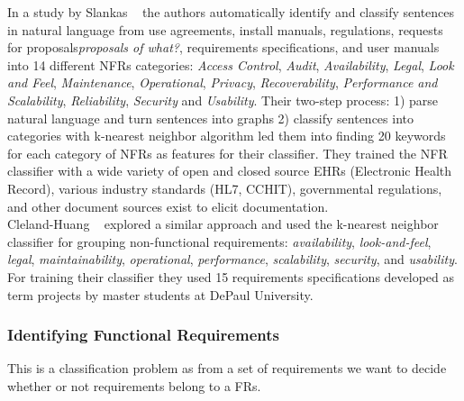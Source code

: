 In a study by Slankas \etal~\cite{Slankas:2013} the authors automatically
identify and classify sentences in natural language from use agreements, install
manuals, regulations, requests for proposals\emph{proposals of what?},
requirements specifications, and user manuals into 14 different NFRs categories:
\emph{Access Control}, \emph{Audit}, \emph{Availability}, \emph{Legal},
\emph{Look and Feel}, \emph{Maintenance}, \emph{Operational}, \emph{Privacy},
\emph{Recoverability}, \emph{Performance and Scalability}, \emph{Reliability},
\emph{Security} and \emph{Usability}.
Their two-step process: 1) parse natural language and turn sentences into graphs
2) classify sentences into categories with k-nearest neighbor algorithm led them
into finding 20 keywords for each category of NFRs as features for their
classifier. They trained the NFR classifier
with a wide variety of open and closed source EHRs (Electronic Health Record),
various industry standards (HL7, CCHIT), governmental regulations, and other
document sources exist to elicit documentation.\\

Cleland-Huang \etal~\cite{Cleland-Huang2007} explored a similar approach and
used the k-nearest neighbor classifier for grouping non-functional requirements:
\emph{availability}, \emph{look-and-feel}, \emph{legal}, \emph{maintainability},
\emph{operational}, \emph{performance}, \emph{scalability}, \emph{security}, and
\emph{usability}. For training their classifier they used 15 requirements
specifications developed as term projects by master students at DePaul University.

\subsubsection{Identifying Functional Requirements}

This
is a classification problem as from a set of requirements we want to decide
whether or not requirements belong to a FRs. 

